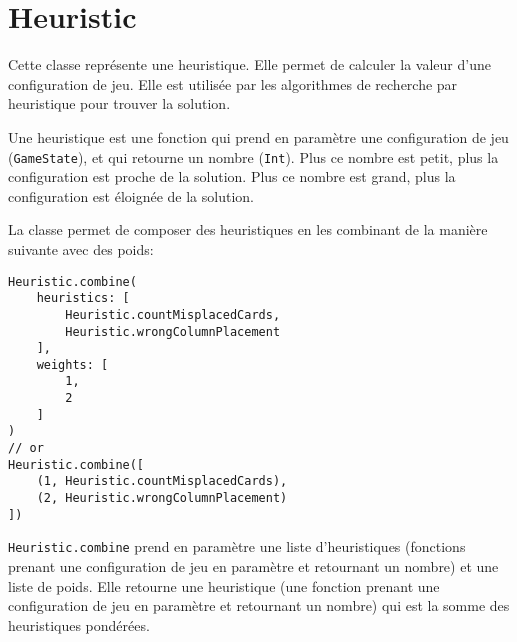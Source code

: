 \section{Heuristic}
Cette classe représente une heuristique. Elle permet de calculer la valeur d'une configuration de jeu. Elle est utilisée par les algorithmes de recherche par heuristique pour trouver la solution.

Une heuristique est une fonction qui prend en paramètre une configuration de jeu (\texttt{GameState}), et qui retourne un nombre (\texttt{Int}). Plus ce nombre est petit, plus la configuration est proche de la solution. Plus ce nombre est grand, plus la configuration est éloignée de la solution.

La classe permet de composer des heuristiques en les combinant de la manière suivante avec des poids:
\begin{lstlisting}
Heuristic.combine(
    heuristics: [
        Heuristic.countMisplacedCards,
        Heuristic.wrongColumnPlacement
    ],
    weights: [
        1,
        2
    ]
)
// or
Heuristic.combine([
    (1, Heuristic.countMisplacedCards),
    (2, Heuristic.wrongColumnPlacement)
])
\end{lstlisting}

\pagebreak

\texttt{Heuristic.combine} prend en paramètre une liste d'heuristiques (fonctions prenant une configuration de jeu en paramètre et retournant un nombre) et une liste de poids. Elle retourne une heuristique (une fonction prenant une configuration de jeu en paramètre et retournant un nombre) qui est la somme des heuristiques pondérées.

